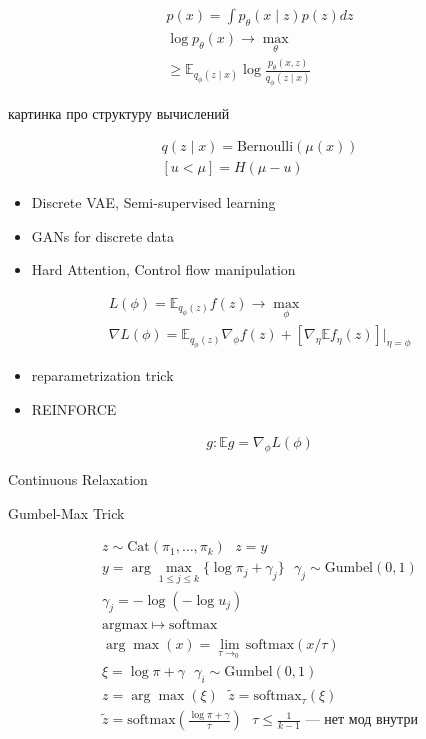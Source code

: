 \documentclass{book}
\begin{document}
\begin{gather*}
    p(x)=\int {p_\theta(x\mid z)p(z)dz}\\
    \log p_\theta(x) \rightarrow\max_\theta\\
    \ge \mathbb{E}_{q_\phi(z\mid x)}\log\frac{p_\theta(x,z)}{q_\phi(z\mid x)}
\end{gather*}

картинка про структуру вычислений

\begin{gather*}
    q(z\mid x)=\mathrm{Bernoulli}(\mu(x))\\
    [u<\mu]=H(\mu-u)
\end{gather*}

\begin{itemize}
    \item Discrete VAE, Semi-supervised learning
    \item GANs for discrete data
    \item Hard Attention, Control flow manipulation
\end{itemize}

\begin{gather*}
    L(\phi)=\mathbb{E}_{q_\phi(z)}f(z) \rightarrow\max_\phi\\
    \nabla L(\phi)=\mathbb{E}_{q_\phi(z)}\nabla_\phi f(z)+[\nabla_\eta \mathbb{E}f_\eta(z)]\bigg|_{\eta=\phi}
\end{gather*}

\begin{itemize}
    \item reparametrization trick
    \item REINFORCE
\end{itemize}

\begin{gather*}
    g: \mathbb{E}g=\nabla_\phi L(\phi)
\end{gather*}

Continuous Relaxation

Gumbel-Max Trick

\begin{gather*}
    z \sim \mathrm{Cat}(\pi_1,\dots,\pi_k)~~~z=y\\
    y=\arg\max_{1\leq j\leq k} \{\log \pi_j+\gamma_j\}~~~\gamma_j\sim\mathrm{Gumbel}(0,1)\\
    \gamma_j=-\log(-\log u_j)\\
  \mathrm{argmax} \mapsto \mathrm{softmax}\\
  \arg\max(x)=\lim_{\tau\rightarrow_0} {\mathrm{softmax}(x/\tau)}\\
  \xi=\log \pi+\gamma~~~\gamma_i\sim \mathrm{Gumbel}(0,1)\\
  z=\arg\max(\xi)~~~\tilde{z}=\mathrm{softmax}_\tau(\xi)\\
  \tilde{z}=\mathrm{softmax}\left(\frac{\log \pi+\gamma}{\tau}\right)~~~\tau\leq\frac{1}{k-1}\textrm{ --- нет мод внутри}
\end{gather*}
\end{document}
